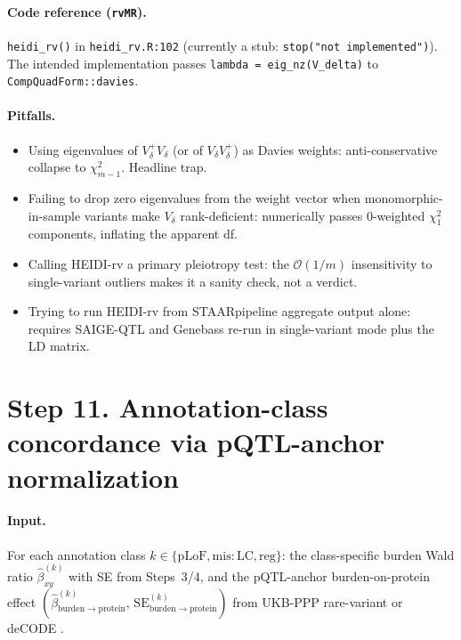 \documentclass[11pt]{article}
\begin{document}
\paragraph{Code reference (\texttt{rvMR}).} \verb|heidi_rv()| in \verb|heidi_rv.R:102| (currently a stub: \verb|stop("not implemented")|). The intended implementation passes \verb|lambda = eig_nz(V_delta)| to \verb|CompQuadForm::davies|.

\paragraph{Pitfalls.}
\begin{itemize}
\item Using eigenvalues of $V_\delta^{+}V_\delta$ (or of $V_\delta V_\delta^{+}$) as Davies weights: anti-conservative collapse to $\chi^2_{m-1}$. Headline trap.
\item Failing to drop zero eigenvalues from the weight vector when monomorphic-in-sample variants make $V_\delta$ rank-deficient: numerically passes $0$-weighted $\chi^2_1$ components, inflating the apparent df.
\item Calling HEIDI-rv a primary pleiotropy test: the $\mathcal{O}(1/m)$ insensitivity to single-variant outliers makes it a sanity check, not a verdict.
\item Trying to run HEIDI-rv from STAARpipeline aggregate output alone: requires SAIGE-QTL and Genebass re-run in single-variant mode plus the LD matrix.
\end{itemize}

\section*{Step 11. Annotation-class concordance via pQTL-anchor normalization}

\paragraph{Input.} For each annotation class $k\in\{\mathrm{pLoF},\mathrm{mis{:}LC},\mathrm{reg}\}$: the class-specific burden Wald ratio $\hat\beta^{(k)}_{xy}$ with SE from Steps~3/4, and the pQTL-anchor burden-on-protein effect $(\hat\beta^{(k)}_{\mathrm{burden}\to\mathrm{protein}},\,\mathrm{SE}^{(k)}_{\mathrm{burden}\to\mathrm{protein}})$ from UKB-PPP rare-variant \citep{Dhindsa2023,SunUKBPPP2023} or deCODE \citep{Ferkingstad2021}.
\end{document}
